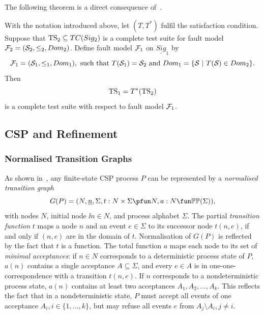  


 The following theorem is a direct consequence of~\cite[Theorem~2.1]{Huang2017}.

\begin{theorem}\label{th:theorytranslation}
With the notation introduced above, let  $(T,T^*)$ fulfil the satisfaction condition.
Suppose that ${\text{TS}}_2 \subseteq TC(Sig_2)$ is a complete test suite
for fault model ${\cal F}_2 = ({\cal S}_2,\le_2,Dom_2)$. Define fault model ${\cal F}_1$ on 
$\underline{Sig}_1$ by
$$
{\cal F}_1 = ({\cal S}_1,\le_1,Dom_1),\ \text{such that}\
T({\cal S}_1)  =  {\cal S}_2\ \text{and}\
Dom_1  =  \{ {\cal S}~|~T({\cal S})\in Dom_2 \}.
$$
Then
$$
{\text{TS}}_1 = T^*({\text{TS}}_2)
$$
is a complete test suite with respect to fault model ${\cal F}_1$.
\xbox
\end{theorem}

 
 


\subsection{CSP and Refinement}

\subsubsection*{Normalised Transition Graphs}

As shown in~\cite{Roscoe:1994:CME:197600}, any finite-state CSP process $P$ can be represented by a \emph{normalised transition graph} 
$$
G(P) = ( N, \ii n, \Sigma, t : N\times\Sigma \pfun N, a : N \fun \mathbb{P}\mathbb{P}(\Sigma)),
$$
with nodes $N$, initial node $\ii n\in N$, and process alphabet $\Sigma$. The partial \emph{transition function} $t$ maps a node $n$ and an event $e\in\Sigma$ to its successor node $t(n,e)$, if and only if $(n,e)$ are in the domain of $t$. Normalisation of $G(P)$ is reflected 
by the fact that $t$ is a function. The total function $a$ maps each node to its set of \emph{minimal acceptances}: 
if $n\in N$ corresponds to a deterministic process state of $P$, $a(n)$ contains a single acceptance $A\subseteq \Sigma$, and every $e\in A$ is in one-one-correspondence with a transition $t(n,e)$. If $n$ corresponds to a nondeterministic process state, $a(n)$ contains at least two acceptances $A_1, A_2, \dots, A_k$. This reflects the fact that in a nondeterministic state, $P$ must accept all events of one acceptance 
$A_i, i \in \{ 1,\dots,k\}$, but may refuse all events $e$ from 
$A_j \setminus A_i, j\neq i$. 

